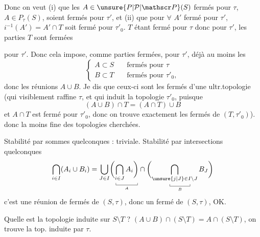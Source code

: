 Donc on veut (i) que les $A\in\unsure{P|\mathcal P|\mathscr P}(S)$ fermés pour $\tau$,  $A\in P_\tau(S)$, soient fermés pour $\tau'$,  et (ii) que pour \uline{$\forall$} $A'$ fermé pour $\tau'$, $i^{-1}(A')=A'\cap T$ soit fermé pour $\tau'_0$.  $T$ étant fermé  pour $\tau$ donc pour $\tau'$, les parties    $T$  sont fermées

pour $ \tau'$. Donc cela impose, comme parties fermées, pour $\tau'$, déjà au moins les
\[
\left\{\begin{aligned}
 A\subset S&\quad\text{fermés pour }\tau\\
 B\subset T&\quad\text{fermés pour }\tau'_0,
\end{aligned}\right.
\]
donc les réunions $A\cup B$. Je dis que ceux-ci sont  les fermés d'une ultr.topologie (qui visiblement raffine $\tau$, et qui induit la topologie $\tau'_0$, puisque
\[
 (A\cup B)\cap T=(A\cap T)\cup B
\]
et $A\cap T$ est fermé pour $\tau'_0$, donc on trouve exactement les fermés de $(T,\tau'_0)$).
 donc la  moins fine des topologies cherchées.

 Stabilité par sommes quelconques : triviale. Stabilité par intersections quelconques
\[
 \bigcap_{i\in I}(A_i\cup B_i)=
 \bigcup_{J\in I}
 \biggl(\underset{\underset{A}{\rule{.35pt}{.3em}\rule{3em}{.35pt}\rule{.35pt}{.3em}}}{\bigcap_{i\in J}A_i\biggr)}
 \cap\biggl(\underset{\underset{B}{\rule{.35pt}{.3em}\rule{2.8em}{.35pt}\rule{.35pt}{.3em}}}{\bigcap_{\unsure{j|J}\in I\setminus J} B_J}\biggr)
\]
c'est une réunion de fermés de $(S,\tau)$, donc un fermé de $(S,\tau)$, OK.

Quelle est la topologie induite  sur $S\setminus T$ ? $(A\cup B)\cap(S\setminus T)=A\cap(S\setminus T)$, on trouve la top. induite par $\tau$.

